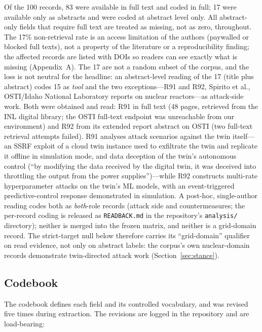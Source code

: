 \documentclass[preprint,12pt]{elsarticle}
\renewcommand{\_}{\plainunderscore\allowbreak}
\begin{document}
Of the 100 records, 83 were available in full text and coded in full; 17 were available only as
abstracts and were coded at abstract level only. All abstract-only fields that require full text are treated as
missing, not as zero, throughout. The 17\% non-retrieval rate is an access limitation of the
authors (paywalled or blocked full texts), not a property of the literature or a reproducibility
finding; the affected records are listed with DOIs so readers can see exactly what is missing
(Appendix~A). The 17 are not a random subset of the corpus, and the loss is not neutral for
the headline: an abstract-level reading of the 17 (title plus abstract) codes 15 as \emph{tool}
and the two exceptions---R91 and R92, Spirito et al., OSTI/Idaho National Laboratory reports
on nuclear reactors---as attack-side work. Both were obtained and read:
R91 in full text (48 pages, retrieved from the INL digital library; the OSTI full-text
endpoint was unreachable from our environment) and R92 from its extended report abstract
on OSTI (two full-text retrieval attempts failed). R91 analyses attack scenarios against
the twin itself---an SSRF exploit of a cloud twin instance used to exfiltrate the twin
and replicate it offline in simulation mode, and data deception of the twin's autonomous
control (``by modifying the data received by the digital twin, it was deceived into
throttling the output from the power supplies'')---while R92 constructs multi-rate
hyperparameter attacks on the twin's ML models, with an event-triggered
predictive-control response demonstrated in simulation. A post-hoc, single-author
reading codes both as \emph{both}-role records (attack side and countermeasures; the
per-record coding is released as \texttt{READBACK.md} in the repository's
\texttt{analysis/} directory); neither is merged
into the frozen matrix, and neither is a grid-domain record. The strict-target null
below therefore carries its ``grid-domain'' qualifier on read evidence, not only on
abstract labels: the corpus's own nuclear-domain records demonstrate twin-directed
attack work (Section~\ref{sec:stance}).

\subsection{Codebook}

The codebook defines each field and its controlled vocabulary, and was revised five times during
extraction. The revisions are logged in the repository and are load-bearing:
\end{document}
